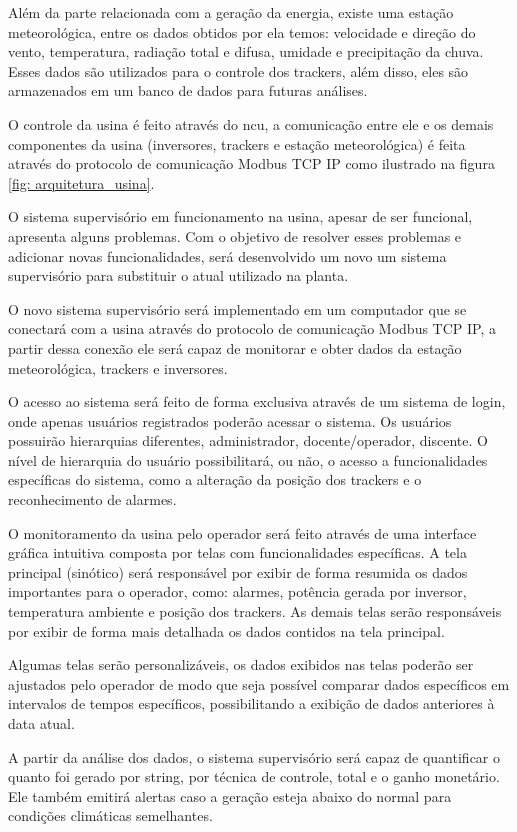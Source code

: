\documentclass[a4paper,12pt]{article}
\begin{document}
Além da parte relacionada com a geração da energia, existe uma estação meteorológica, entre os dados obtidos por ela temos: velocidade e direção do vento, temperatura, radiação total e difusa, umidade e precipitação da chuva. Esses dados são utilizados para o controle dos \gls{tracker}s, além disso, eles são armazenados em um banco de dados para futuras análises.

O controle da usina é feito através do \acrfull{ncu}, a comunicação entre ele e os demais componentes da usina (inversores, \gls{tracker}s e estação meteorológica) é feita através do protocolo de comunicação Modbus TCP IP como ilustrado na figura \ref{fig: arquitetura_usina}.

O sistema supervisório em funcionamento na usina, apesar de ser funcional, apresenta alguns problemas. Com o objetivo de resolver esses problemas e adicionar novas funcionalidades, será desenvolvido um novo um sistema supervisório para substituir o atual utilizado na planta. 

O novo sistema supervisório será implementado em um computador que se conectará com a usina através do protocolo de comunicação Modbus TCP IP, a partir dessa conexão ele será capaz de monitorar e obter dados da estação meteorológica, trackers e inversores. 

O acesso ao sistema será feito de forma exclusiva através de um sistema de login, onde apenas usuários registrados poderão acessar o sistema. Os usuários possuirão hierarquias diferentes, administrador, docente/operador, discente. O nível de hierarquia do usuário possibilitará, ou não, o acesso a funcionalidades específicas do sistema, como a alteração da posição dos trackers e o reconhecimento de alarmes.

O monitoramento da usina pelo operador será feito através de uma interface gráfica intuitiva composta por telas com funcionalidades específicas. A tela principal (sinótico) será responsável por exibir de forma resumida os dados importantes para o operador, como: alarmes, potência gerada por inversor, temperatura ambiente e posição dos trackers. As demais telas serão responsáveis por exibir de forma mais detalhada os dados contidos na tela principal.

Algumas telas serão personalizáveis, os dados exibidos nas telas poderão ser ajustados pelo operador de modo que seja possível comparar dados específicos em intervalos de tempos específicos, possibilitando a exibição de dados anteriores à data atual. 

A partir da análise dos dados, o sistema supervisório será capaz de quantificar o quanto foi gerado por string, por técnica de controle, total  e o ganho monetário. Ele também emitirá alertas caso a geração esteja abaixo do normal para condições climáticas semelhantes.
\end{document}
